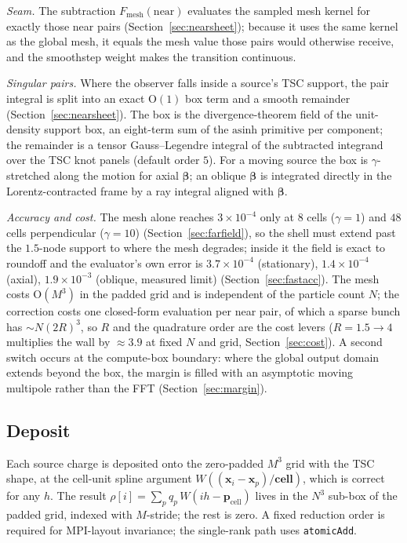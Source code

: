 \emph{Seam.}
The subtraction $F_{\mathrm{mesh}}(\mathrm{near})$ evaluates the sampled mesh
kernel for exactly those near pairs (Section~\ref{sec:nearsheet}); because it
uses the same kernel as the global mesh, it equals the mesh value those pairs
would otherwise receive, and the smoothstep weight makes the transition
continuous.

\emph{Singular pairs.}
Where the observer falls inside a source's TSC support, the pair integral is
split into an exact $\mathrm{O}(1)$ box term and a smooth remainder
(Section~\ref{sec:nearsheet}). The box is the divergence-theorem field of the
unit-density support box, an eight-term sum of the $\mathrm{asinh}$ primitive
per component; the remainder is a tensor Gauss--Legendre integral of the
subtracted integrand over the TSC knot panels (default order $5$). For a moving
source the box is $\gamma$-stretched along the motion for axial $\boldsymbol\beta$;
an oblique $\boldsymbol\beta$ is integrated directly in the Lorentz-contracted
frame by a ray integral aligned with $\boldsymbol\beta$.

\emph{Accuracy and cost.}
The mesh alone reaches $3\times10^{-4}$ only at $8$ cells ($\gamma=1$) and
$48$ cells perpendicular ($\gamma=10$) (Section~\ref{sec:farfield}), so the
shell must extend past the $1.5$-node support to where the mesh degrades;
inside it the field is exact to roundoff and the evaluator's own error is
$3.7\times10^{-4}$ (stationary), $1.4\times10^{-4}$ (axial),
$1.9\times10^{-3}$ (oblique, measured limit) (Section~\ref{sec:fastacc}). The
mesh costs $\mathrm{O}(M^{3})$ in the padded grid and is independent of the
particle count $N$; the correction costs one closed-form evaluation per near
pair, of which a sparse bunch has $\sim N(2R)^{3}$, so $R$ and the quadrature
order are the cost levers ($R=1.5\!\to\!4$ multiplies the wall by
$\approx3.9$ at fixed $N$ and grid, Section~\ref{sec:cost}). A second switch
occurs at the compute-box boundary: where the global output domain extends
beyond the box, the margin is filled with an asymptotic moving multipole rather
than the FFT (Section~\ref{sec:margin}).

\subsection{Deposit}

Each source charge is deposited onto the zero-padded $M^3$ grid with the TSC
shape, at the cell-unit spline argument
$W((\mathbf{x}_i-\mathbf{x}_p)/\mathbf{cell})$, which is correct for any $h$.
The result $\rho[i]=\sum_p q_p\,W(i h-\mathbf{p}_{\mathrm{cell}})$ lives in
the $N^3$ sub-box of the padded grid, indexed with $M$-stride; the rest is
zero. A fixed reduction order is required for MPI-layout invariance; the
single-rank path uses \texttt{atomicAdd}.

